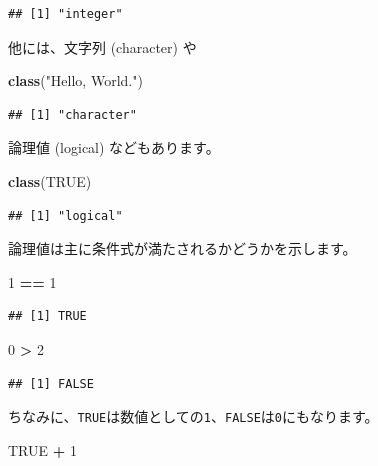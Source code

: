 \documentclass[]{bxjsreport}
\newenvironment{Shaded}{\begin{snugshade}}{\end{snugshade}}
\newcommand{\DecValTok}[1]{\textcolor[rgb]{0.00,0.00,0.81}{#1}}
\newcommand{\KeywordTok}[1]{\textcolor[rgb]{0.13,0.29,0.53}{\textbf{#1}}}
\newcommand{\NormalTok}[1]{#1}
\newcommand{\OperatorTok}[1]{\textcolor[rgb]{0.81,0.36,0.00}{\textbf{#1}}}
\newcommand{\OtherTok}[1]{\textcolor[rgb]{0.56,0.35,0.01}{#1}}
\newcommand{\StringTok}[1]{\textcolor[rgb]{0.31,0.60,0.02}{#1}}
\begin{document}
\begin{verbatim}
## [1] "integer"
\end{verbatim}

他には、文字列 (character) や

\begin{Shaded}
\begin{Highlighting}[]
\KeywordTok{class}\NormalTok{(}\StringTok{"Hello, World."}\NormalTok{)}
\end{Highlighting}
\end{Shaded}

\begin{verbatim}
## [1] "character"
\end{verbatim}

論理値 (logical) などもあります。

\begin{Shaded}
\begin{Highlighting}[]
\KeywordTok{class}\NormalTok{(}\OtherTok{TRUE}\NormalTok{)}
\end{Highlighting}
\end{Shaded}

\begin{verbatim}
## [1] "logical"
\end{verbatim}

論理値は主に条件式が満たされるかどうかを示します。

\begin{Shaded}
\begin{Highlighting}[]
\DecValTok{1} \OperatorTok{==}\StringTok{ }\DecValTok{1}
\end{Highlighting}
\end{Shaded}

\begin{verbatim}
## [1] TRUE
\end{verbatim}

\begin{Shaded}
\begin{Highlighting}[]
\DecValTok{0} \OperatorTok{>}\StringTok{ }\DecValTok{2}
\end{Highlighting}
\end{Shaded}

\begin{verbatim}
## [1] FALSE
\end{verbatim}

ちなみに、\texttt{TRUE}は数値としての\texttt{1}、\texttt{FALSE}は\texttt{0}にもなります。

\begin{Shaded}
\begin{Highlighting}[]
\OtherTok{TRUE} \OperatorTok{+}\StringTok{ }\DecValTok{1}
\end{Highlighting}
\end{Shaded}
\end{document}
